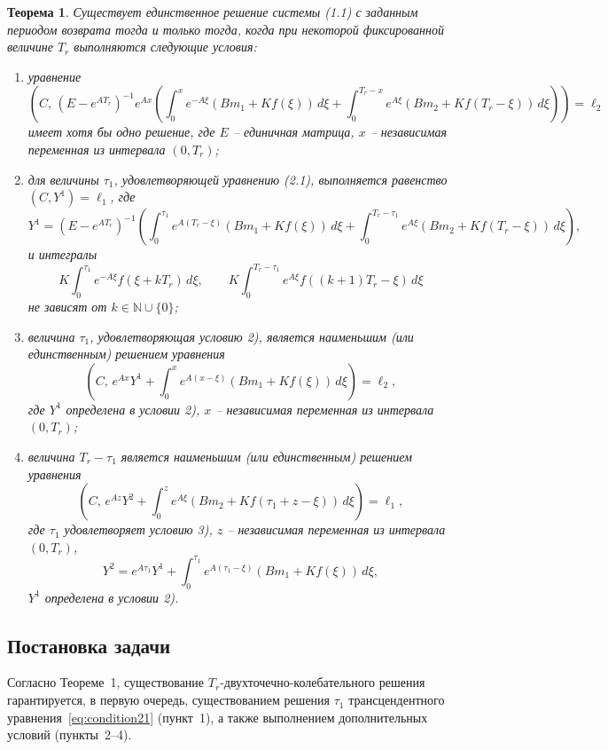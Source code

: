 \documentclass[12pt,a4paper]{article}
\theoremstyle{bigplain}
\newtheorem*{theorem}{Теорема}
\theoremstyle{plain}
\begin{document}
\begin{theorem} \cite{Eustafieva}
Существует единственное решение системы (1.1) с заданным периодом возврата тогда и только тогда, когда при некоторой фиксированной величине $T_r$ выполняются следующие условия:

\begin{enumerate}[label=\arabic*)]
\item уравнение
\begin{equation}
\left(
C,\,
(E-e^{AT_r})^{-1}e^{Ax}
\left(\int_0^x e^{-A\xi}(Bm_1+Kf(\xi))\,d\xi
+\int_0^{T_r-x} e^{A\xi}(Bm_2+Kf(T_r-\xi))\,d\xi
\right)
\right)=\ell_2
\tag{2.1}
\label{eq:condition21}
\end{equation}
имеет хотя бы одно решение, где $E$ -- единичная матрица, $x$ -- независимая переменная из интервала $(0,T_r)$;

\item для величины $\tau_1$, удовлетворяющей уравнению (2.1), выполняется равенство \newline
$(C,Y^1)=\ell_1$, где
\[
Y^1=(E-e^{AT_r})^{-1}\left(\int_0^{\tau_1} e^{A(T_r-\xi)}(Bm_1+Kf(\xi))\,d\xi+\int_0^{T_r-\tau_1} e^{A\xi}(Bm_2+Kf(T_r-\xi))\,d\xi\right),
\]
и интегралы
\[
K\int_0^{\tau_1} e^{-A\xi}f(\xi+kT_r)\,d\xi,
\qquad
K\int_0^{T_r-\tau_1} e^{A\xi}f((k+1)T_r-\xi)\,d\xi
\]
не зависят от $k\in\mathbb{N}\cup\{0\}$;

\item величина $\tau_1$, удовлетворяющая условию 2), является наименьшим (или единственным) решением уравнения
\[
\left(C,\,e^{Ax}Y^1+\int_0^x e^{A(x-\xi)}(Bm_1+Kf(\xi))\,d\xi
\right)=\ell_2,
\]
где $Y^1$ определена в условии 2), $x$ -- независимая переменная из интервала $(0,T_r)$;

\item величина $T_r-\tau_1$ является наименьшим (или единственным) решением уравнения
\[
\left(C,\,e^{Az}Y^2+\int_0^z e^{A\xi}(Bm_2+Kf(\tau_1+z-\xi))\,d\xi
\right)=\ell_1,
\]
где $\tau_1$ удовлетворяет условию 3), $z$ -- независимая переменная из интервала $(0,T_r)$,
\[
Y^2=e^{A\tau_1}Y^1+\int_0^{\tau_1} e^{A(\tau_1-\xi)}(Bm_1+Kf(\xi))\,d\xi,
\]
$Y^1$ определена в условии 2).
\end{enumerate}
\end{theorem}


\subsection*{Постановка задачи}

Согласно Теореме~1, существование $T_r$-двухточечно-колебательного решения
гарантируется, в первую очередь, существованием решения $\tau_1$
трансцендентного уравнения~\eqref{eq:condition21} (пункт~1),
а также выполнением дополнительных условий (пункты~2--4).
\end{document}
